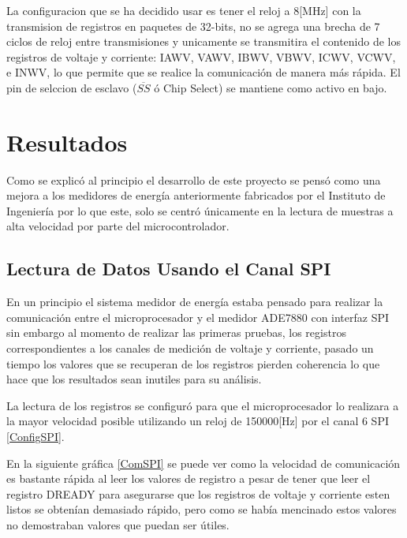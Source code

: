 \documentclass[letterpaper,12pt,oneside]{book}
\begin{document}
			La configuracion que se ha decidido usar es tener el reloj a 8[MHz] con la transmision de registros en paquetes de 32-bits, no se agrega una brecha de 7 ciclos de reloj entre transmisiones y unicamente se transmitira el contenido de los registros de voltaje y corriente: IAWV, VAWV, IBWV, VBWV, ICWV, VCWV, e INWV, lo que permite que se realice la comunicación de manera más rápida. El pin de selccion de esclavo ($\overline{SS}$ ó Chip Select) se mantiene como activo en bajo. %
	\chapter{Resultados}
	Como se explicó al principio el desarrollo de este proyecto se pensó como una mejora a los medidores de energía anteriormente fabricados por el Instituto de Ingeniería por lo que este, solo se centró únicamente en la lectura de muestras a alta velocidad por parte del microcontrolador.
		\section{Lectura de Datos Usando el Canal SPI}
		En un principio el sistema medidor de energía estaba pensado para realizar la comunicación entre el microprocesador y el medidor ADE7880 con interfaz SPI sin embargo al momento de realizar las primeras pruebas, los registros correspondientes a los canales de medición de voltaje y corriente, pasado un tiempo los valores que se recuperan de los registros pierden coherencia lo que hace que los resultados sean inutiles para su análisis.

		La lectura de los registros se configuró para que el microprocesador lo realizara a la mayor velocidad posible utilizando un reloj de 150000[Hz] por el canal 6 SPI \ref{ConfigSPI}.

		En la siguiente gráfica \ref{ComSPI} se puede ver como la velocidad de comunicación es bastante rápida al leer los valores de registro a pesar de tener que leer el registro DREADY para asegurarse que los registros de voltaje y corriente esten listos se obtenían demasiado rápido, pero como se había mencinado estos valores no demostraban valores que puedan ser útiles.
\end{document}
